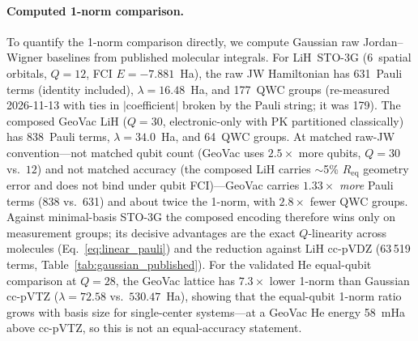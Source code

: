 \documentclass[aps,pra,twocolumn,superscriptaddress,longbibliography]{revtex4-2}
\newcommand{\gvq}[2]{#2}
\begin{document}
\paragraph{Computed 1-norm comparison.}
To quantify the 1-norm comparison directly, we compute Gaussian raw
Jordan--Wigner baselines from published molecular integrals.
For LiH~STO-3G (6~spatial orbitals, $Q = 12$, FCI $E = -7.881$~Ha),
the raw JW Hamiltonian has \gvq{lih_sto3g_raw}{631}~Pauli terms (identity
included), $\lambda = \gvq{lih_sto3g_lambda}{16.48}$~Ha, and
\gvq{lih_sto3g_qwc}{177}~QWC groups (re-measured 2026-11-13 with ties in $|$coefficient$|$ broken by the Pauli string; it was 179).  The composed GeoVac LiH ($Q = 30$, electronic-only
with PK partitioned classically) has \gvq{lih_composed_pauli}{838}~Pauli terms,
$\lambda = \gvq{lih_composed_lambda}{34.0}$~Ha, and 64~QWC groups.
At matched raw-JW
convention---not matched qubit count (GeoVac uses $2.5\times$ more
qubits, $Q=30$ vs.\ $12$) and not matched accuracy (the composed LiH
carries $\sim$5\% $R_\mathrm{eq}$ geometry error and does not bind
under qubit FCI)---GeoVac carries $1.33\times$ \emph{more} Pauli terms
(838 vs.\ 631) and about twice the 1-norm, with $2.8\times$ fewer QWC
groups.  Against minimal-basis STO-3G the composed encoding therefore
wins only on measurement groups; its decisive advantages are the exact
$Q$-linearity across molecules (Eq.~\eqref{eq:linear_pauli}) and the
reduction against LiH cc-pVDZ (\gvq{lih_ccpvdz_pauli}{63\,519} terms,
Table~\ref{tab:gaussian_published}).  For the validated He equal-qubit comparison at $Q = 28$,
the GeoVac lattice has $7.3\times$ lower 1-norm than Gaussian
cc-pVTZ ($\lambda = \gvq{he_n3_lambda}{72.58}$ vs.\ $530.47$~Ha), showing that the
equal-qubit 1-norm ratio grows with basis size for single-center
systems---at a GeoVac He energy 58~mHa above cc-pVTZ, so this is not an
equal-accuracy statement.
\end{document}
